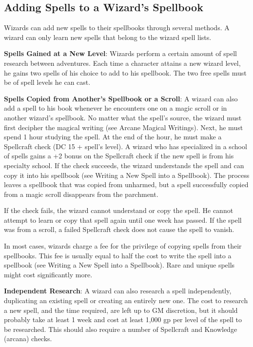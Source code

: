 \subsection{Adding Spells to a Wizard's Spellbook}

				
Wizards can add new spells to their spellbooks through several methods. A wizard can only learn new spells that belong to the wizard spell lists.
				
\textbf{Spells Gained at a New Level}: Wizards perform a certain amount of spell research between adventures. Each time a character attains a new wizard level, he gains two spells of his choice to add to his spellbook. The two free spells must be of spell levels he can cast.
				
\textbf{Spells Copied from Another's Spellbook or a Scroll}: A wizard can also add a spell to his book whenever he encounters one on a magic scroll or in another wizard's spellbook. No matter what the spell's source, the wizard must first decipher the magical writing (see Arcane Magical Writings). Next, he must spend 1 hour studying the spell. At the end of the hour, he must make a Spellcraft check (DC 15 + spell's level). A wizard who has specialized in a school of spells gains a +2 bonus on the Spellcraft check if the new spell is from his specialty school. If the check succeeds, the wizard understands the spell and can copy it into his spellbook (see Writing a New Spell into a Spellbook). The process leaves a spellbook that was copied from unharmed, but a spell successfully copied from a magic scroll disappears from the parchment.
				
If the check fails, the wizard cannot understand or copy the spell. He cannot attempt to learn or copy that spell again until one week has passed. If the spell was from a scroll, a failed Spellcraft check does not cause the spell to vanish.
				
In most cases, wizards charge a fee for the privilege of copying spells from their spellbooks. This fee is usually equal to half the cost to write the spell into a spellbook (see Writing a New Spell into a Spellbook). Rare and unique spells might cost significantly more.
				
\textbf{Independent Research}: A wizard can also research a spell independently, duplicating an existing spell or creating an entirely new one. The cost to research a new spell, and the time required, are left up to GM discretion, but it should probably take at least 1 week and cost at least 1,000 gp per level of the spell to be researched. This should also require a number of Spellcraft and Knowledge (arcana) checks.
				

